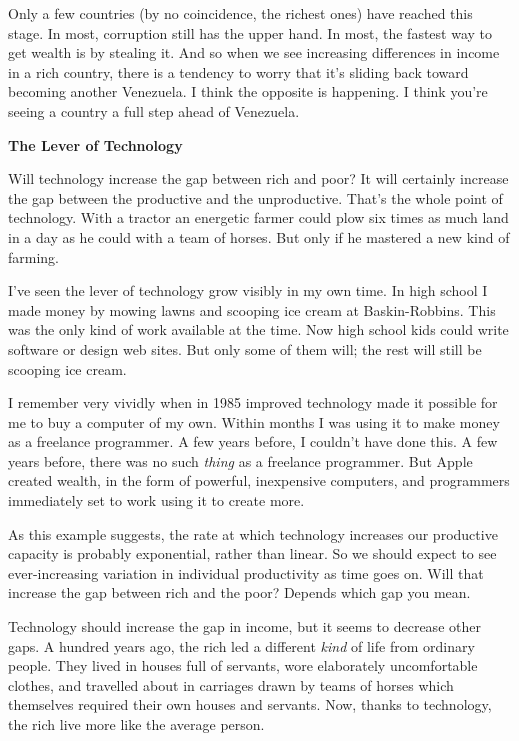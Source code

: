 \documentclass[12pt]{book}
\begin{document}
Only a few countries (by no coincidence, the richest ones) have reached
this stage. In most, corruption still has the upper hand. In most, the
fastest way to get wealth is by stealing it. And so when we see
increasing differences in income in a rich country, there is a tendency
to worry that it's sliding back toward becoming another Venezuela. I
think the opposite is happening. I think you're seeing a country a full
step ahead of Venezuela.

\textbf{The Lever of Technology}

Will technology increase the gap between rich and poor? It will
certainly increase the gap between the productive and the unproductive.
That's the whole point of technology. With a tractor an energetic farmer
could plow six times as much land in a day as he could with a team of
horses. But only if he mastered a new kind of farming.

I've seen the lever of technology grow visibly in my own time. In high
school I made money by mowing lawns and scooping ice cream at
Baskin-Robbins. This was the only kind of work available at the time.
Now high school kids could write software or design web sites. But only
some of them will; the rest will still be scooping ice cream.

I remember very vividly when in 1985 improved technology made it
possible for me to buy a computer of my own. Within months I was using
it to make money as a freelance programmer. A few years before, I
couldn't have done this. A few years before, there was no such
\emph{thing} as a freelance programmer. But Apple created wealth, in the
form of powerful, inexpensive computers, and programmers immediately set
to work using it to create more.

As this example suggests, the rate at which technology increases our
productive capacity is probably exponential, rather than linear. So we
should expect to see ever-increasing variation in individual
productivity as time goes on. Will that increase the gap between rich
and the poor? Depends which gap you mean.

Technology should increase the gap in income, but it seems to decrease
other gaps. A hundred years ago, the rich led a different \emph{kind} of
life from ordinary people. They lived in houses full of servants, wore
elaborately uncomfortable clothes, and travelled about in carriages
drawn by teams of horses which themselves required their own houses and
servants. Now, thanks to technology, the rich live more like the average
person.
\end{document}
